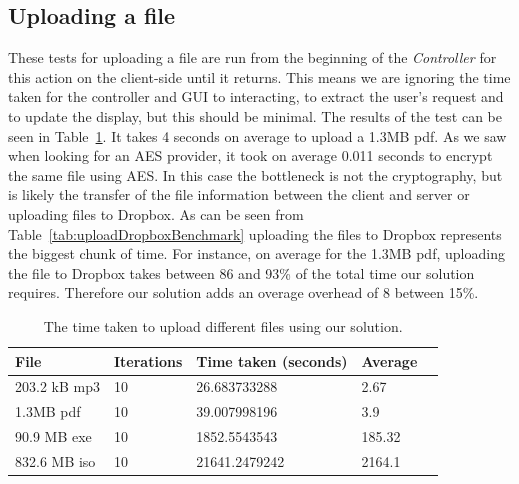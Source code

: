 \documentclass[12pt, titlepage]{article}
\begin{document}
\subsection{Uploading a file}
These tests for uploading a file are run from the beginning of the \textit{Controller} for this action on the client-side until it returns. This means we are ignoring the time taken for the controller and GUI to interacting, to extract the user's request and to update the display, but this should be minimal.
\newline \indent The results of the test can be seen in Table~\ref{tab:uploadBenchmark}. It takes 4 seconds on average to upload a 1.3MB pdf. As we saw when looking for an AES provider, it took on average 0.011 seconds to encrypt the same file using AES. In this case the bottleneck is not the cryptography, but is likely the transfer of the file information between the client and server or uploading files to Dropbox. As can be seen from Table~\ref{tab:uploadDropboxBenchmark} uploading the files to Dropbox represents the biggest chunk of time. For instance, on average for the 1.3MB pdf, uploading the file to Dropbox takes between 86 and 93\% of the total time our solution requires. Therefore our solution adds an overage overhead of 8 between 15\%.

\bigskip
\begin{table}[h!]
\begin{center}
    \begin{tabular}{ | l | l | l | l | l |}
    \hline
    \textbf{File} & \textbf{Iterations} & \textbf{Time taken (seconds)} & \textbf{Average} \\ \hline
    203.2 kB mp3 & 10 & 26.683733288 & 2.67 \\ \hline
    1.3MB pdf & 10 & 39.007998196 & 3.9 \\ \hline
    90.9 MB exe & 10 & 1852.5543543 & 185.32 \\ \hline
    832.6 MB iso & 10 & 21641.2479242 & 2164.1 \\ \hline
    \end{tabular}
    \caption{The time taken to upload different files using our solution.} \label{tab:uploadBenchmark}
    \end{center}
\end{table}
\end{document}
